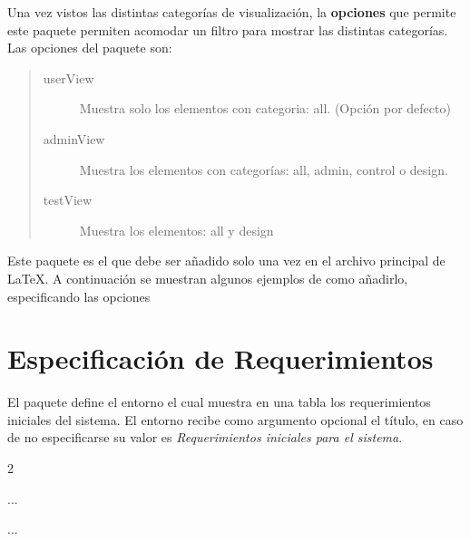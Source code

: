 \noindent Una vez vistos las distintas categorías de visualización, la {\bf opciones} que permite este paquete permiten acomodar un filtro para mostrar las distintas categorías. Las opciones del paquete son:
    
    \begin{quote}
    \begin{description}
        \item[userView] Muestra solo los elementos con categoria: all. (Opción por defecto)
        \item[adminView] Muestra los elementos con categorías: all, admin, control o design.
        \item[testView] Muestra los elementos: all y design
    \end{description}
    \end{quote}
    
\noindent Este paquete es el que debe ser añadido solo una vez en el archivo principal de \LaTeX. A continuación se muestran algunos ejemplos de como añadirlo, especificando las opciones
    
    \begin{code}
\usepackage{cdt/cdtAnalisys}
\usepackage[userView]{cdt/cdtAnalisys}
\usepackage[adminView]{cdt/cdtAnalisys}
\usepackage[testView]{cdt/cdtAnalisys}
    \end{code}

\section{Especificación de Requerimientos}

El paquete define el entorno  el cual muestra en una tabla los requerimientos iniciales del sistema. El entorno recibe como argumento opcional el título, en caso de no especificarse su valor es {\it Requerimientos iniciales para el sistema}.
    
    \begin{multicols}{2}
    \begin{code}
\begin{requerimientos}
    ...
\end{requerimientos}
    \end{code}
    \columnbreak
    \begin{code}
\begin{requerimientos}[Titulo]
  ...
\end{requerimientos}
    \end{code}
    \end{multicols}

